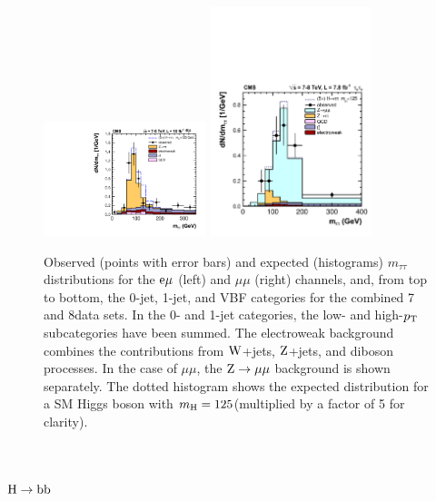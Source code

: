 \documentclass[11pt,twoside,a4paper,cmspaper,final,collab]{cms-tdr}
\begin{document}
\begin{figure}[htbp]
\begin{center}
\includegraphics[width=0.42\textwidth]{figures/htt/emu_vbf_rescaled_7and8TeV.pdf}
\includegraphics[width=0.42\textwidth]{figures/htt/mumu_rescaled_vbf.pdf}
\end{center}
\caption{Observed (points with error bars) and expected (histograms) $m_{\tau\tau}$ distributions for the $\mathrm{e}\mu$ (left) and $\mu\mu$ (right) channels, and,
from top to bottom, the 0-jet, 1-jet, and VBF categories for the combined 7  and 8\TeV data sets.
In the 0- and 1-jet categories, the low- and high-$p_{\mathrm{T}}$ subcategories have been summed.
The electroweak background combines the contributions from $\mathrm{W}$+jets, $\mathrm{Z}$+jets, and diboson processes.
In the case of $\mu\mu$, the $\mathrm{Z}\to\mu\mu$ background is shown separately.
The dotted histogram shows the expected distribution for a SM Higgs boson with $m_{\mathrm{H}}=125$\GeV (multiplied by a factor of 5 for clarity).
}
\label{fig:htt_mtt_leplep}
\end{figure}

\section{\texorpdfstring{$\mathrm{H}\to\mathrm{b}\mathrm{b}$}{H to bb}\label{sec:hbb}}
\end{document}
